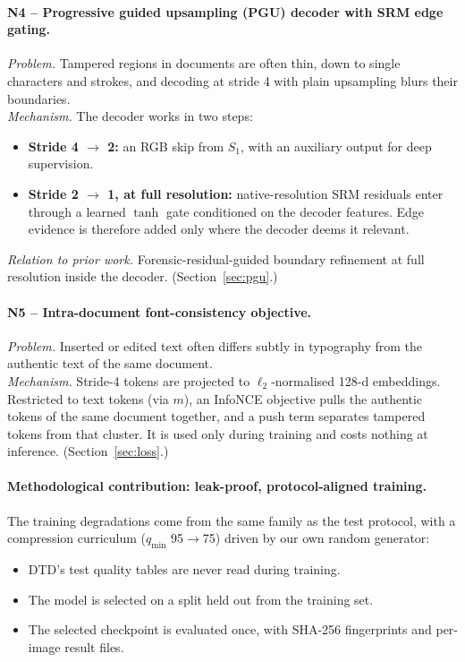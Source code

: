 \documentclass[10pt,a4paper]{article}
\begin{document}
\paragraph{N4 -- Progressive guided upsampling (PGU) decoder with SRM edge gating.}
\emph{Problem.} Tampered regions in documents are often thin, down to single characters
and strokes, and decoding at stride 4 with plain upsampling blurs their boundaries.\\
\emph{Mechanism.} The decoder works in two steps:
\begin{itemize}
  \item \textbf{Stride 4 $\rightarrow$ 2:} an RGB skip from $S_1$, with an auxiliary output
        for deep supervision.
  \item \textbf{Stride 2 $\rightarrow$ 1, at full resolution:} native-resolution SRM residuals
        enter through a learned $\tanh$ gate conditioned on the decoder features. Edge
        evidence is therefore added only where the decoder deems it relevant.
\end{itemize}
\emph{Relation to prior work.} Forensic-residual-guided boundary refinement at full
resolution inside the decoder.
(Section~\ref{sec:pgu}.)

\paragraph{N5 -- Intra-document font-consistency objective.}
\emph{Problem.} Inserted or edited text often differs subtly in typography from the
authentic text of the same document.\\
\emph{Mechanism.} Stride-4 tokens are projected to $\ell_2$-normalised 128-d embeddings.
Restricted to text tokens (via $m$), an InfoNCE objective pulls the authentic tokens of the
same document together, and a push term separates tampered tokens from that cluster. It is
used only during training and costs nothing at inference.
(Section~\ref{sec:loss}.)

\paragraph{Methodological contribution: leak-proof, protocol-aligned training.}
The training degradations come from the same family as the test protocol, with a
compression curriculum ($q_{\min}$ 95$\rightarrow$75) driven by our own random generator:
\begin{itemize}
  \item DTD's test quality tables are never read during training.
  \item The model is selected on a split held out from the training set.
  \item The selected checkpoint is evaluated once, with SHA-256 fingerprints and per-image
        result files.
\end{itemize}
\end{document}

